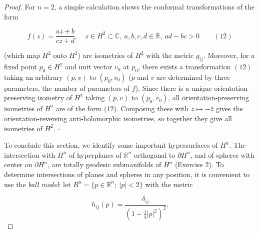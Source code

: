 \begin{proof}
  For $n=2$, a simple calculation shows the conformal transformations of the form
  
  $$
  f(z)=\frac{az+b}{cz+d},\quad z\in H^2\subset\mathbb{C},\ a,b,c,d\in\mathbb{R},\ ad-bc>0\qquad(12)
  $$
  
  (which map $H^2$ onto $H^2$) are isometries of $H^2$ with the metric $g_{ij}$.
  Moreover, for a fixed point $p_0\in H^2$ and unit vector $v_0$ at $p_0$, there
  exists a transformation $(12)$ taking an arbitrary $(p,v)$ to $(p_0,v_0)$ ($p$ and
  $v$ are determined by three parameters, the number of parameters of $f$). Since
  there is a unique orientation-preserving isometry of $H^2$ taking $(p,v)$ to
  $(p_0,v_0)$, all orientation-preserving isometries of $H^2$ are of the form (12).
  Composing these with $z\mapsto-\bar z$ gives the orientation-reversing
  anti-holomorphic isometries, so together they give all isometries of $H^2$.
  $\square$
  
  To conclude this section, we identify some important hypersurfaces of $H^n$. The
  intersection with $H^n$ of hyperplanes of $\mathbb{R}^n$ orthogonal to $\partial H^n$,
  and of spheres with center on $\partial H^n$, are totally geodesic submanifolds of
  $H^n$ (Exercise 2). To determine intersections of planes and spheres in any
  position, it is convenient to use the \emph{ball model}: let
  $B^n=\{p\in\mathbb{R}^n;\ |p|<2\}$ with the metric
  
  $$
  h_{ij}(p)=\frac{\delta_{ij}}{(1-\tfrac14|p|^2)^2}.
  $$
\end{proof}

